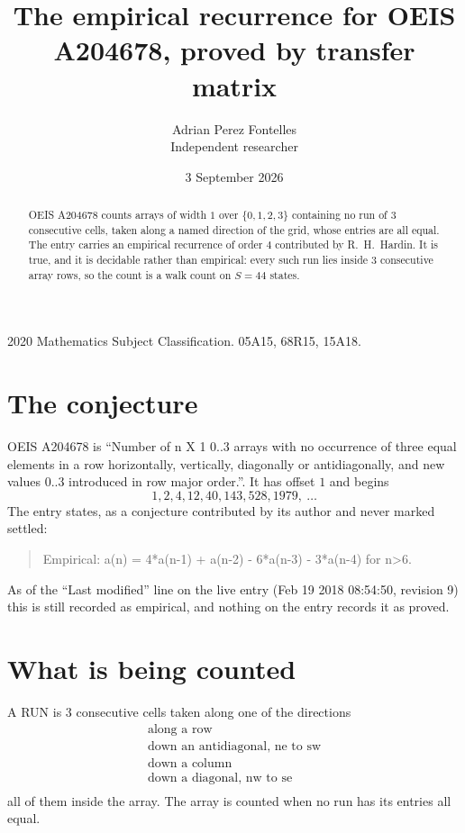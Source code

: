 \documentclass[11pt,a4paper]{article}
\title{The empirical recurrence for OEIS A204678, proved by transfer matrix}
\author{Adrian Perez Fontelles\\ \small Independent researcher}
\date{3 September 2026}
\theoremstyle{plain}
\theoremstyle{definition}
\begin{document}
\maketitle

\begin{abstract}
OEIS A204678 counts arrays of width $1$ over $\{0,1,2,3\}$ containing no run of $3$ consecutive
cells, taken along a named direction of the grid, whose entries are all equal. The entry carries
an empirical recurrence of order $4$ contributed by R.~H.~Hardin. It is true, and it is
decidable rather than empirical: every such run lies inside $3$ consecutive array rows, so
the count is a walk count on $S=44$ states.
\end{abstract}

\noindent\small 2020 Mathematics Subject Classification. 05A15, 68R15, 15A18.\normalsize

\section{The conjecture}

OEIS A204678 is ``Number of n X 1 0..3 arrays with no occurrence of three equal elements in a row horizontally, vertically, diagonally or antidiagonally, and new values 0..3 introduced in row major order.''. It has offset $1$ and begins
\[
1, 2, 4, 12, 40, 143, 528, 1979,\ \dots
\]
The entry states, as a conjecture contributed by its author and never marked settled:
\begin{quote}
Empirical: a(n) = 4*a(n-1) + a(n-2) - 6*a(n-3) - 3*a(n-4) for n>6.
\end{quote}
As of the ``Last modified'' line on the live entry (Feb 19 2018 08:54:50, revision 9) this is still
recorded as empirical, and nothing on the entry records it as proved.

\section{What is being counted}

A RUN is $3$ consecutive cells taken along one of the directions
\[
\begin{array}{l}
\text{along a row} \\
\text{down an antidiagonal, ne to sw} \\
\text{down a column} \\
\text{down a diagonal, nw to se} \\
\end{array}
\]
all of them inside the array. The array is counted when no run has its entries all equal.
\end{document}
